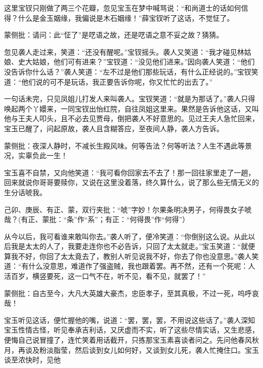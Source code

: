 \begin{parag}


    这里宝钗只刚做了两三个花瓣，忽见宝玉在梦中喊骂说：“和尚道士的话如何信得？什么是金玉姻缘，我偏说是木石姻缘！”薛宝钗听了这话，不觉怔了。\begin{note}蒙侧批：请问：此“怔了”是呓语之故，还是呓语之意不妥之故？猜猜。\end{note}忽见袭人走过来，笑道：“还没有醒呢。”宝钗摇头。袭人又笑道：“我才碰见林姑娘、史大姑娘，他们可有进来？”宝钗道：“没见他们进来。”因向袭人笑道：“他们没告诉你什么话？”袭人笑道：“左不过是他们那些玩话，有什么正经说的。”宝钗笑道：“他们说的可不是玩话，我正要告诉你呢，你又忙忙的出去了。”
\end{parag}


\begin{parag}


    一句话未完，只见凤姐儿打发人来叫袭人。宝钗笑道：“就是为那话了。”袭人只得唤起两个丫嬛来，一同宝钗出怡红院，自往凤姐这里来。果然是告诉他这话，又叫他与王夫人叩头，且不必去见贾母，倒把袭人不好意思的。见过王夫人急忙回来，宝玉已醒了，问起原故，袭人且含糊答应，至夜间人静，袭人方告诉。\begin{note}蒙侧批：夜深人静时，不减长生殿风味。何等告法？何等听法？人生不遇此等景况，实辜负此一生！\end{note}宝玉喜不自禁，又向他笑道：“我可看你回家去不去了！那一回往家里走了一趟，回来就说你哥哥要赎你，又说在这里没着落，终久算什么，说了那么些无情无义的生分话唬我。\begin{note}己卯、庚辰、有正、蒙，双行夹批：“唬”字妙！尔果条明决男子，何得畏女子唬哉？(有正、蒙批：“条”作“系”；有正：“何得畏”作“何得”）\end{note}从今以后，我可看谁来敢叫你去。”袭人听了，便冷笑道：“你倒别这么说。从此以后我是太太的人了，我要走连你也不必告诉，只回了太太就走。”宝玉笑道：“就便算我不好，你回了太太竟去了，教别人听见说我不好，你去了你也没意思。”袭人笑道：“有什么没意思，难道作了强盗贼，我也跟着罢。再不然，还有一个死呢：人活百岁，横竖要死，这一口气不在，听不见，看不见，就罢了！”\begin{note}蒙侧批：自古至今，大凡大英雄大豪杰，忠臣孝子，至其真极，不过一死，呜呼哀哉！\end{note}宝玉听见这话，便忙握他的嘴，说道：“罢，罢，罢，不用说这些话了。”袭人深知宝玉性情古怪，听见奉承吉利话，又厌虚而不实，听了这些尽情实话，又生悲感，便悔自己说冒撞了，连忙笑着用话截开，只拣那宝玉素喜谈者问之。先问他春风秋月，再谈及粉淡脂莹，然后谈到女儿如何好，又谈到女儿死，袭人忙掩住口。宝玉谈至浓快时，见他
\end{parag}
